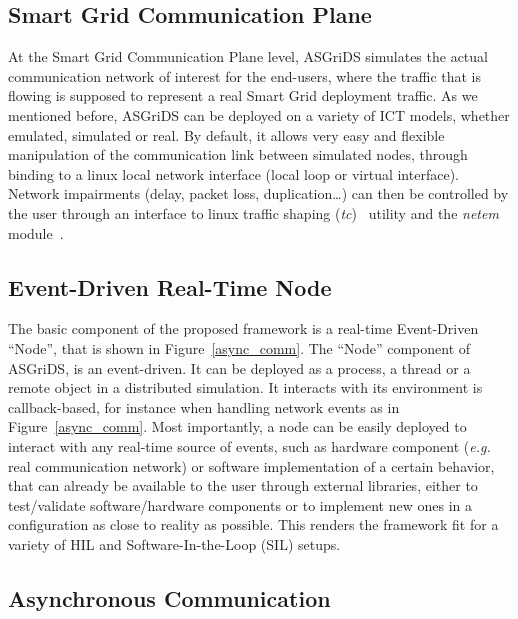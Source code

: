 \documentclass[conference]{IEEEtran}
\begin{document}
\subsection{Smart Grid Communication Plane}\label{sgcomm_plane}

At the Smart Grid Communication Plane level, ASGriDS simulates the actual communication network of interest for the end-users, where the traffic that is flowing is supposed to represent a real Smart Grid deployment traffic.
As we mentioned before, ASGriDS can be deployed on a variety of ICT models, whether emulated, simulated or real. By default, it allows very easy and flexible manipulation of the communication link between simulated nodes, through binding to a linux local network interface (local loop or virtual interface). Network impairments (delay, packet loss, duplication\dots) can then be controlled by the user through an interface to linux traffic shaping (\textit{tc})~\cite{hubert2002linux} utility and the \textit{netem} module~\cite{hemminger2005network}.


\subsection{Event-Driven Real-Time Node}\label{rt_node}

The basic component of the proposed framework is a real-time Event-Driven ``Node'', that is shown in Figure~\ref{async_comm}.
The ``Node'' component of ASGriDS, is an event-driven. It can be deployed as a process, a thread or a remote object in a distributed simulation. It interacts with its environment is callback-based, for instance when handling network events as in Figure~\ref{async_comm}. Most importantly, a node can be easily deployed to interact with any real-time source of events, such as hardware component (\emph{e.g.} real communication network) or software implementation of a certain behavior, that can already be available to the user through external libraries, either to test/validate software/hardware components or to implement new ones in a configuration as close to reality as possible. This renders the framework fit for a variety of HIL and Software-In-the-Loop (SIL) setups.

\subsection{Asynchronous Communication} \label{AsyncComm}
\end{document}

